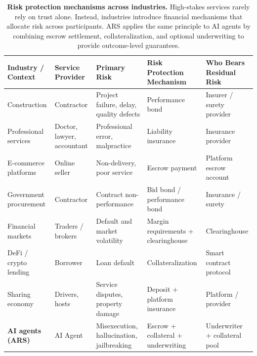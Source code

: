 \begin{table}[t]
\centering
\small
\begin{tabular}{p{2.5cm} p{2.8cm} p{3cm} p{3.3cm} p{2.3cm}}
\toprule
\textbf{Industry / Context} & \textbf{Service Provider} & \textbf{Primary Risk} & \textbf{Risk Protection Mechanism} & \textbf{Who Bears Residual Risk} \\
\midrule
Construction & Contractor & Project failure, delay, quality defects & Performance bond & Insurer / surety provider \\

Professional services & Doctor, lawyer, accountant & Professional error, malpractice & Liability insurance & Insurance provider \\

E-commerce platforms & Online seller & Non-delivery, poor service & Escrow payment & Platform escrow account \\

Government procurement & Contractor & Contract non-performance & Bid bond / performance bond & Insurance / surety \\

Financial markets & Traders / brokers & Default and market volatility & Margin requirements + clearinghouse & Clearinghouse \\

DeFi / crypto lending & Borrower & Loan default & Collateralization & Smart contract protocol \\

Sharing economy & Drivers, hosts & Service disputes, property damage & Deposit + platform insurance & Platform / provider \\

\textbf{AI agents (ARS)} & AI Agent & Misexecution, hallucination, jailbreaking & Escrow + collateral + underwriting & Underwriter + collateral pool \\

\bottomrule
\end{tabular}
\caption{\textbf{Risk protection mechanisms across industries.} 
High-stakes services rarely rely on trust alone. Instead, industries introduce financial mechanisms that allocate risk across participants. \textsc{ARS} applies the same principle to AI agents by combining escrow settlement, collateralization, and optional underwriting to provide outcome-level guarantees.}
\label{tab:risk-mechanisms}
\end{table}